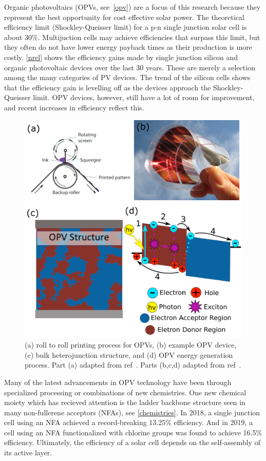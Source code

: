 Organic photovoltaics (OPVs, see~\autoref{opv}) are a focus of this research because they represent the best opportunity for cost effective solar power.
The theoretical efficiency limit (Shockley-Queisser limit) for a p-n single junction solar cell is about 30\%\cite{Shockley1961}.
Multijuction cells may achieve efficiencies that surpass this limit, but they often do not have lower energy payback times as their production is more costly.
\autoref{nrel} shows the efficiency gains made by single junction silicon and organic photovoltaic devices over the last 30 years.
These are merely a selection among the many categories of PV devices.
The trend of the silicon cells shows that the efficiency gain is levelling off as the devices approach the Shockley-Queisser limit.
OPV devices, however, still have a lot of room for improvement, and recent increases in efficiency reflect this.
\begin{figure}
    \centering
    \includegraphics[width=\linewidth]{images/dou-miller2018c-fig.pdf}
    \caption{(a) roll to roll printing process for OPVs, (b) example OPV device, (c) bulk heterojunction structure, and (d) OPV energy generation process. Part (a) adapted from ref~\cite{Dou2013}. Parts (b,c,d) adapted from ref~\cite{Miller2018c}.}\label{opv}
\end{figure}
Many of the latest advancements in OPV technology have been through specialized processing or combinations of new chemistries.
One new chemical moiety which has recieved attention is the ladder backbone structure seen in many non-fullerene acceptors (NFAs), see \autoref{chemistries}.
In 2018, a single junction cell using an NFA achieved a record-breaking 13.25\% efficiency\cite{raynergy}.
And in 2019, a cell using an NFA functionalized with chlorine groups was found to achieve 16.5\% efficiency\cite{Cui2019}. 
Ultimately, the efficiency of a solar cell depends on the self-assembly of its active layer.

